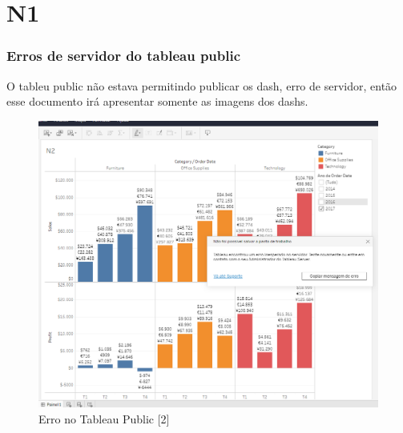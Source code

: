 \chapter{N1}

\subsection*{Erros de servidor do tableau public}
O tableu public não estava permitindo publicar os dash, erro de servidor, então esse documento irá apresentar somente as imagens dos dashs.

\begin{figure}[h]
	\centering
	\includegraphics[width=\textwidth,keepaspectratio]{figures/erro_servidor_2}
	\caption{Erro no Tableau Public [2]}
	\label{lof}
\end{figure}


